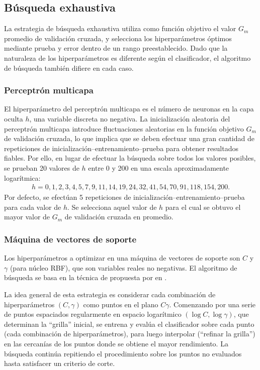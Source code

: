 %
%
\subsection{Búsqueda exhaustiva}
%
La estrategia de búsqueda exhaustiva utiliza como función objetivo el
valor $G_m$ promedio de validación cruzada, y selecciona los
hiperparámetros óptimos mediante prueba y error dentro de un rango
preestablecido. Dado que la naturaleza de los hiperparámetros es
diferente según el clasificador, el algoritmo de búsqueda también
difiere en cada caso.
%
\subsubsection{Perceptrón multicapa}
%
El hiperparámetro del perceptrón multicapa es el número de neuronas en
la capa oculta $h$, una variable discreta no negativa. La
inicialización aleatoria del perceptrón multicapa introduce
fluctuaciones aleatorias en la función objetivo $G_m$ de validación
cruzada, lo que implica que se deben efectuar una gran cantidad de
repeticiones de inicialización--entrenamiento--prueba para obtener
resultados fiables.  Por ello, en lugar de efectuar la búsqueda sobre
todos los valores posibles, se prueban 20 valores de $h$ entre 0 y 200
en una escala aproximadamente logarítmica:
%
\begin{align}
  \label{mlp-hidden-tries}
  h=0,1,2,3,4,5,7,9,11,14,19,24,32,41,54,70,91,118,154,200.
\end{align}
%
Por defecto, se efectúan 5 repeticiones de
inicialización--entrenamiento--prueba para cada valor de $h$. Se
selecciona aquel valor de $h$ para el cual se obtuvo el mayor valor de
$G_m$ de validación cruzada en promedio.
%
\subsubsection{Máquina de vectores de soporte}
%
Los hiperparámetros a optimizar en una máquina de vectores de soporte
son $C$ y $\gamma$ (para núcleo RBF), que son variables reales no
negativas. El algoritmo de búsqueda se basa en la técnica de
 propuesta por \citeauthor{hsu} en
\cite{hsu}.

La idea general de esta estrategia es considerar cada combinación de
hiperparámetros $(C,\gamma)$ como puntos en el plano
$C\gamma$. Comenzando por una serie de puntos espaciados regularmente
en espacio logarítmico $(\log C,\log\gamma)$, que determinan la
``grilla'' inicial, se entrena y evalúa el clasificador sobre cada
punto (cada combinación de hiperparámetros), para luego interpolar
(``refinar la grilla'') en las cercanías de los puntos donde se
obtiene el mayor rendimiento. La búsqueda continúa repitiendo el
procedimiento sobre los puntos no evaluados hasta satisfacer un
criterio de corte.

